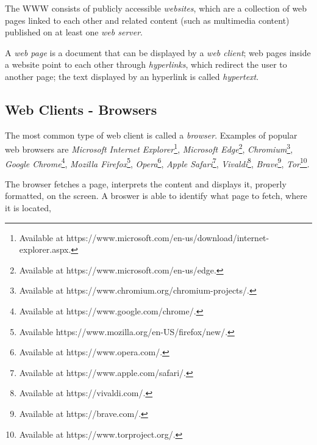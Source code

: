 The \acf{WWW} consists of publicly accessible \textit{websites}, which are a collection of web pages linked to each other and related content (such as multimedia content) published on at least one \textit{web server}.

A \textit{web page} is a document that can be displayed by a \textit{web client}; web pages inside a website point to each other through \textit{hyperlinks}, which redirect the user to another page; the text displayed by an hyperlink is called \textit{hypertext}.

\subsection{Web Clients - Browsers}
\label{subsection:webClientsBrowsers}

The most common type of web client is called a \textit{browser}. Examples of popular web browsers are \textit{Microsoft Internet Explorer}\footnote{Available at https://www.microsoft.com/en-us/download/internet-explorer.aspx.}, \textit{Microsoft Edge}\footnote{Available at https://www.microsoft.com/en-us/edge.}, \textit{Chromium}\footnote{Available at https://www.chromium.org/chromium-projects/.}, \textit{Google Chrome}\footnote{Available at https://www.google.com/chrome/.}, \textit{Mozilla Firefox}\footnote{Available https://www.mozilla.org/en-US/firefox/new/.}, \textit{Opera}\footnote{Available at https://www.opera.com/.}, \textit{Apple Safari}\footnote{Available at https://www.apple.com/safari/.}, \textit{Vivaldi}\footnote{Available at https://vivaldi.com/.}, \textit{Brave}\footnote{Available at https://brave.com/.}, \textit{Tor}\footnote{Available at https://www.torproject.org/.}. 

The browser fetches a page, interprets the content and displays it, properly formatted, on the screen. A broswer is able to identify what page to fetch, where it is located, 